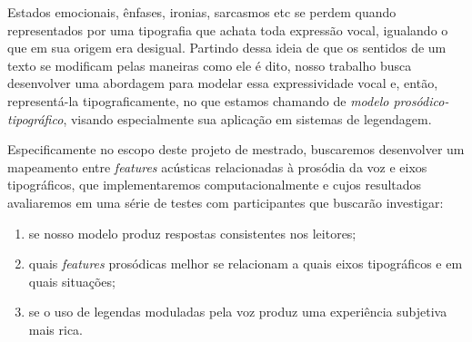 \documentclass[a4paper]{tufte-handout}
\begin{document}
Estados emocionais, ênfases, ironias, sarcasmos etc se perdem quando representados por uma tipografia que achata toda expressão vocal, igualando o que em sua origem era desigual. Partindo dessa ideia de que os sentidos de um texto se modificam pelas maneiras como ele é dito, nosso trabalho busca desenvolver uma abordagem para modelar essa expressividade vocal e, então, representá-la tipograficamente, no que estamos chamando de \textit{modelo prosódico-tipográfico}, visando especialmente sua aplicação em sistemas de legendagem.

Especificamente no escopo deste projeto de mestrado, buscaremos desenvolver um mapeamento entre \textit{features} acústicas relacionadas à prosódia da voz e eixos tipográficos, que implementaremos computacionalmente e cujos resultados avaliaremos em uma série de testes com participantes que buscarão investigar:
\begin{enumerate}
    \item se nosso modelo produz respostas consistentes nos leitores;
    \item quais \textit{features} prosódicas melhor se relacionam a quais eixos tipográficos e em quais situações;
    \item se o uso de legendas moduladas pela voz produz uma experiência subjetiva mais rica.
\end{enumerate}



\end{document}
